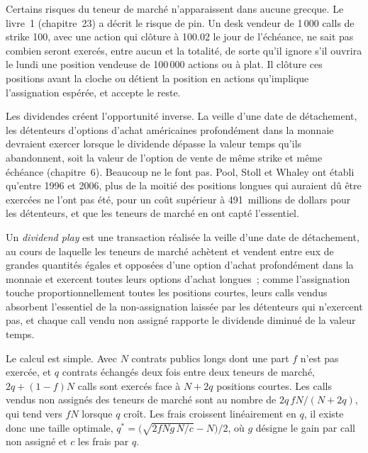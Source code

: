 Certains risques du teneur de marché n'apparaissent dans aucune grecque. Le livre~1 (chapitre~23) a décrit le risque de pin. Un desk vendeur de 1\,000 calls de strike 100, avec une action qui clôture
à 100.02 le jour de l'échéance, ne sait pas combien seront exercés, entre aucun et la totalité, de sorte qu'il ignore s'il ouvrira le lundi
une position vendeuse de 100\,000 actions ou à plat. Il clôture ces positions avant la cloche ou détient la position en actions qu'implique l'assignation espérée, et accepte le reste.

Les dividendes créent l'opportunité inverse. La veille d'une date de détachement, les détenteurs d'options d'achat américaines profondément dans la monnaie devraient exercer lorsque le dividende
dépasse la valeur temps qu'ils abandonnent, soit la valeur de l'option de vente de même strike et même échéance (chapitre~6). Beaucoup ne le font pas. Pool, Stoll et Whaley ont établi
qu'entre 1996 et 2006, plus de la moitié des positions longues qui auraient dû être exercées ne l'ont pas été, pour un coût supérieur à 491~millions de dollars pour les détenteurs, et que les teneurs de marché
en ont capté l'essentiel.

\begin{definition}\label{def:dv:options-market-making-in-practice:play}
Un \emph{dividend play} est une transaction réalisée la veille d'une date de détachement, au cours de laquelle les teneurs de marché achètent et vendent entre eux de grandes quantités égales et opposées d'une option d'achat
profondément dans la monnaie et exercent toutes leurs options d'achat longues~; comme l'assignation touche proportionnellement toutes les positions courtes, leurs calls vendus absorbent
l'essentiel de la non-assignation laissée par les détenteurs qui n'exercent pas, et chaque call vendu non assigné rapporte le dividende diminué de la valeur temps.
\end{definition}

Le calcul est simple. Avec $N$ contrats publics longs dont une part $f$ n'est pas exercée, et $q$ contrats échangés deux fois entre deux teneurs de marché,
$2q+(1-f)N$ calls sont exercés face à $N+2q$ positions courtes. Les calls vendus non assignés des teneurs de marché sont au nombre de $2q\,fN/(N+2q)$, qui tend vers $fN$ lorsque
$q$ croît. Les frais croissent linéairement en $q$, il existe donc une taille optimale, $q^*=\bigl(\sqrt{2fNg\,N/c}-N\bigr)/2$, où $g$ désigne le gain par call non assigné et $c$ les frais
par $q$.

